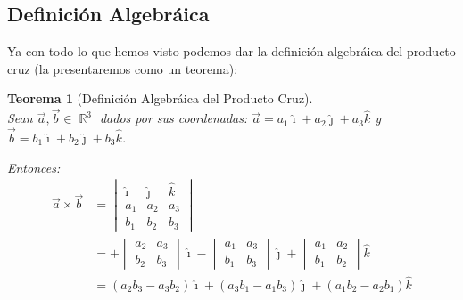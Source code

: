 \documentclass[12pt, fleqn]{report}                             %
\newcommand \ForceNewLine {$\Space$\\}                          %
\DeclareMathOperator \Space {\quad}                             %
\newtheorem{Theorem}{Teorema}[section]                          %
\theoremstyle{break}                                            %
\DeclareMathOperator \Reals        {\mathbb{R}}                 %
\newcommand{\hati} {\hat{\imath}}                               %
\newcommand{\hatj} {\hat{\jmath}}                               %
\newcommand{\hatk} {\hat{k}}                                    %
\newcommand{\lVector}[1]                                        %
        { \ensuremath{\begin{vmatrix}#1\end{vmatrix}} }             %
\begin{document}
            \subsection{Definición Algebráica}


                Ya con todo lo que hemos visto podemos dar la definición algebráica del producto
                cruz (la presentaremos como un teorema):

                \vspace{1em}
                \begin{Theorem}[Definición Algebráica del Producto Cruz]
                    \ForceNewLine
                    Sean $\vec{a}, \vec{b} \in \Reals^3$ dados por sus coordenadas:
                    $\vec{a}=a_1\hati + a_2\hatj + a_3\hatk$ y $\vec{b} = b_1\hati + b_2\hatj + b_3\hatk$.

                    Entonces:
                    \begin{align}
                        \vec{a} \times \vec{b} 
                            &= 
                                \lVector{\hati & \hatj & \hatk \\ a_1 & a_2 & a_3 \\ b_1 & b_2 & b_3}           \\
                            &= 
                                + \lVector{a_2 & a_3 \\ b_2 & b_3} \hati
                                - \lVector{a_1 & a_3 \\ b_1 & b_3} \hatj
                                + \lVector{a_1 & a_2 \\ b_1 & b_2} \hatk                                        \\
                            &= 
                                (a_2b_3 - a_3b_2)\hati + (a_3b_1 - a_1b_3)\hatj + (a_1b_2 - a_2b_1)\hatk
                    \end{align}
                \end{Theorem}
            
\end{document}

